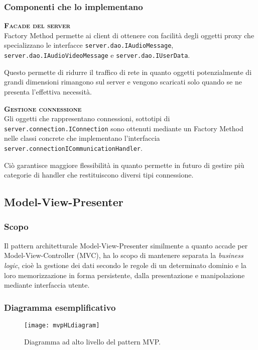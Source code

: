\subsubsection{Componenti che lo implementano}
\begin{description}
  \item{\scshape\bfseries Facade del server}\\
Factory Method permette ai client di ottenere con facilità degli oggetti proxy che specializzano le interfacce \texttt{server.dao.IAudioMessage}, \texttt{server.dao.IAudioVideoMessage} e \texttt{server.dao.IUserData}.

Questo permette di ridurre il traffico di rete in quanto oggetti potenzialmente di grandi dimensioni rimangono sul server e vengono scaricati solo quando se ne presenta l'effettiva necessità.
  \item{\scshape\bfseries Gestione connessione}\\
Gli oggetti che rappresentano connessioni, sottotipi di \texttt{server.connection.IConnection} sono ottenuti mediante un Factory Method nelle classi concrete che implementano l'interfaccia \texttt{server.connectionICommunicationHandler}.

Ciò garantisce maggiore flessibilità in quanto permette in futuro di gestire più categorie di handler che restituiscono diversi tipi connessione.
\end{description}

\subsection{Model-View-Presenter}

\subsubsection{Scopo}
Il pattern architetturale \foreignlanguage{english}{Model-View-Presenter} similmente a quanto accade per \foreignlanguage{english}{Model-View-Controller} (MVC), ha lo scopo di mantenere separata la \textit{business logic}, cioè la gestione dei dati secondo le regole di un determinato dominio e la loro memorizzazione in forma persistente, dalla presentazione e manipolazione mediante interfaccia utente.

\subsubsection{Diagramma esemplificativo}
\begin{figure}[h]
\centering
\texttt{[image: mvpHLdiagram]}
\caption{Diagramma ad alto livello del pattern MVP.}\label{fig:mvpHL}
\end{figure}

